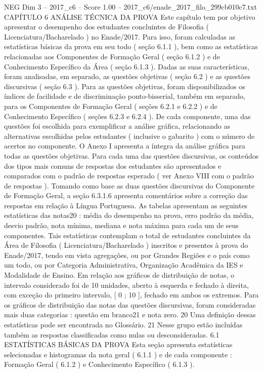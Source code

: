 \begin{textsample}{NEG Dim 3 – 2017\_c6 – Score 1.00 – 2017\_c6/enade\_2017\_filo\_299cb010c7.txt}  \label{ex:f3_neg_086}
CAPÍTULO 6 ANÁLISE TÉCNICA DA PROVA Este capítulo tem por objetivo apresentar o desempenho dos estudantes concluintes de Filosofia ( Licenciatura/Bacharelado ) no Enade/2017.
Para isso, foram calculadas as estatísticas básicas da prova em seu todo ( seção 6.1.1 ), bem como as estatísticas relacionadas aos Componentes de Formação Geral ( seção 6.1.2 ) e de Conhecimento Específico da Área ( seção 6.1.3 ).
Dadas as suas características, foram analisadas, em separado, as questões objetivas ( seção 6.2 ) e as questões discursivas ( seção 6.3 ).
Para as questões objetivas, foram disponibilizados os índices de facilidade e de discriminação ponto-bisserial, também em separado, para os Componentes de Formação Geral ( seções 6.2.1 e 6.2.2 ) e de Conhecimento Específico ( seções 6.2.3 e 6.2.4 ).
De cada componente, uma das questões foi escolhida para exemplificar a análise gráfica, relacionando as alternativas escolhidas pelos estudantes ( inclusive o gabarito ) com o número de acertos no componente.
O Anexo I apresenta a íntegra da análise gráfica para todas as questões objetivas.
Para cada uma das questões discursivas, os conteúdos dos tipos mais comuns de respostas dos estudantes são apresentados e comparados com o padrão de respostas esperado ( ver Anexo VIII com o padrão de respostas ).
Tomando como base as duas questões discursivas do Componente de Formação Geral, a seção 6.3.1.6 apresenta comentários sobre a correção das respostas em relação à Língua Portuguesa.
As tabelas apresentam as seguintes estatísticas das notas20 : média do desempenho na prova, erro padrão da média, desvio padrão, nota mínima, mediana e nota máxima para cada um de seus componentes.
Tais estatísticas contemplam o total de estudantes concluintes da Área de Filosofia ( Licenciatura/Bacharelado ) inscritos e presentes à prova do Enade/2017, tendo em vista agregações, ou por Grandes Regiões e o país como um todo, ou por Categoria Administrativa, Organização Acadêmica da IES e Modalidade de Ensino.
Em relação aos gráficos de distribuição de notas, o intervalo considerado foi de 10 unidades, aberto à esquerda e fechado à direita, com exceção do primeiro intervalo, [ 0 ; 10 ], fechado em ambos os extremos.
Para os gráficos de distribuição das notas das questões discursivas, foram consideradas mais duas categorias : questão em branco21 e nota zero. 20 Uma definição dessas estatísticas pode ser encontrada no Glossário. 21 Nesse grupo estão incluídas também as respostas classificadas como nulas ou desconsideradas. 6.1 ESTATÍSTICAS BÁSICAS DA PROVA Esta seção apresenta estatísticas selecionadas e histogramas da nota geral ( 6.1.1 ) e de cada componente : Formação Geral ( 6.1.2 ) e Conhecimento Específico ( 6.1.3 ).

\end{textsample}
